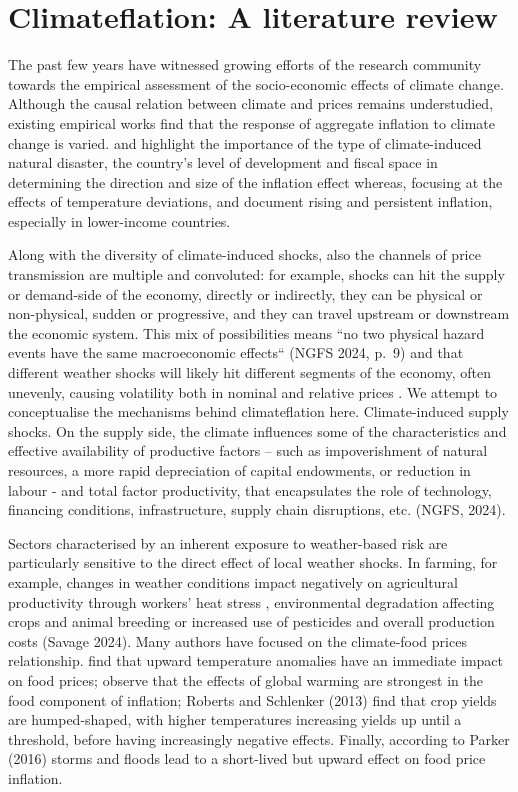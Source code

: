 \documentclass[
  letterpaper,
  DIV=11,
  numbers=noendperiod]{scrartcl}
\begin{document}
\section{Climateflation: A literature
review}\label{climateflation-a-literature-review}

The past few years have witnessed growing efforts of the research
community towards the empirical assessment of the socio-economic effects
of climate change. Although the causal relation between climate and
prices remains understudied, existing empirical works find that the
response of aggregate inflation to climate change is varied.
\citet{parker2018} and \citet{cevik2023} highlight the importance of the
type of climate-induced natural disaster, the country's level of
development and fiscal space in determining the direction and size of
the inflation effect whereas, focusing at the effects of temperature
deviations, \citet{mukherjee2021} and \citet{kotz2024} document rising
and persistent inflation, especially in lower-income countries.

Along with the diversity of climate-induced shocks, also the channels of
price transmission are multiple and convoluted: for example, shocks can
hit the supply or demand-side of the economy, directly or indirectly,
they can be physical or non-physical, sudden or progressive, and they
can travel upstream or downstream the economic system. This mix of
possibilities means ``no two physical hazard events have the same
macroeconomic effects`` (NGFS 2024, p.~9) and that different weather
shocks will likely hit different segments of the economy, often
unevenly, causing volatility both in nominal and relative prices
\citep{buelens2024}. We attempt to conceptualise the mechanisms behind
climateflation here. Climate-induced supply shocks. On the supply side,
the climate influences some of the characteristics and effective
availability of productive factors -- such as impoverishment of natural
resources, a more rapid depreciation of capital endowments, or reduction
in labour - and total factor productivity, that encapsulates the role of
technology, financing conditions, infrastructure, supply chain
disruptions, etc. (NGFS, 2024).

Sectors characterised by an inherent exposure to weather-based risk are
particularly sensitive to the direct effect of local weather shocks. In
farming, for example, changes in weather conditions impact negatively on
agricultural productivity through workers' heat stress
\citep{delima2021}, environmental degradation affecting crops and animal
breeding \citep{liang2017} or increased use of pesticides and overall
production costs (Savage 2024). Many authors have focused on the
climate-food prices relationship. \citet{faccia2021} find that upward
temperature anomalies have an immediate impact on food prices;
\citet{kotz2024} observe that the effects of global warming are
strongest in the food component of inflation; Roberts and Schlenker
(2013) find that crop yields are humped-shaped, with higher temperatures
increasing yields up until a threshold, before having increasingly
negative effects. Finally, according to Parker (2016) storms and floods
lead to a short-lived but upward effect on food price inflation.
\end{document}
